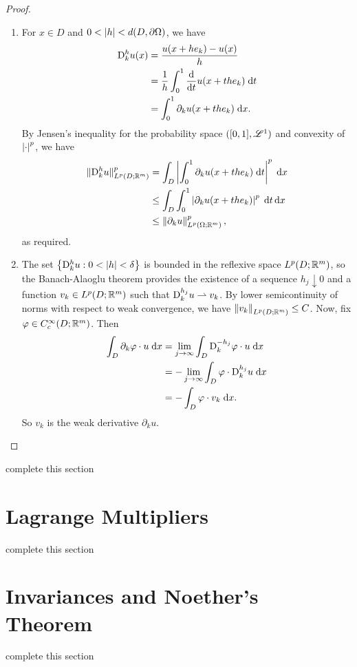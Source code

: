 \begin{proof}
    \begin{enumerate}[label = (\arabic*)]
        \item For $x \in D$ and $0 < \left\lvert {h} \right\rvert < d(D,\partial \Omega)$, we have
        \begin{equation} \begin{aligned}
            \mathrm{D}^h_k u(x) &= \frac{u(x+he_k) - u(x)}{h} \\
                        &= \frac{1}{h} \int_0^1 \frac{\mathrm{d}}{\mathrm{d} t} u(x+the_k) \; \mathrm{d} t \\
                        &= \int_0^1 \partial_k u(x+the_k) \; \mathrm{d} x.
        \end{aligned} \end{equation}
        By Jensen's inequality for the probability space $([0,1],\mathscr{L}^1)$ and convexity of $\left\lvert {\cdot} \right\rvert^p$, we have 
        \begin{equation} \begin{aligned}
            \lVert {\mathrm{D}^h_k u} \rVert_{L^p(D;\mathbb{R}^m)}^p &= \int_D \left\lvert { \int_0^1 \partial_k u(x+the_k) \; \mathrm{d}t} \right\rvert^p \; \mathrm{d} x \\
                                              &\leq \int_D \int_0^1 \left\lvert {\partial_k u(x+the_k)} \right\rvert^p \; \mathrm{d} t \, \mathrm{d} x \\
                                              &\leq \left\lVert {\partial_k u} \right\rVert_{L^p(\Omega;\mathbb{R}^m)}^p,
        \end{aligned} \end{equation}
        as required.

        \item The set $\left\{ {\mathrm{D}^h_k u : 0 < \left\lvert {h} \right\rvert < \delta} \right\}$ is bounded in the reflexive space $L^p(D;\mathbb{R}^m)$, so the Banach-Alaoglu theorem provides the existence of a sequence $h_j \downarrow 0$ and a function $v_k \in L^p(D;\mathbb{R}^m)$ such that $\mathrm{D}^{h_j}_k u \rightharpoonup v_k$. By lower semicontinuity of norms with respect to weak convergence, we have $\left\lVert {v_k} \right\rVert_{L^p(D;\mathbb{R}^m)} \leq C$. Now, fix $\varphi \in C_c^\infty(D;\mathbb{R}^m)$. Then 
        \begin{equation} \begin{aligned}
            \int_D \partial_k \varphi \cdot u \; \mathrm{d} x &= \lim_{j \to \infty} \int_D \mathrm{D}^{-h_j}_k \varphi \cdot u \; \mathrm{d} x \\
                                                   &= - \lim_{j \to \infty} \int_D \varphi \cdot \mathrm{D}^{h_j}_k u \; \mathrm{d} x \\
                                                   &= - \int_D \varphi \cdot v_k \; \mathrm{d} x.
        \end{aligned} \end{equation}
        So $v_k$ is the weak derivative $\partial_k u$.
    \end{enumerate}
\end{proof}

{\color{red} complete this section}

\section{Lagrange Multipliers}
{\color{red} complete this section}

\section{Invariances and Noether's Theorem}
{\color{red} complete this section}